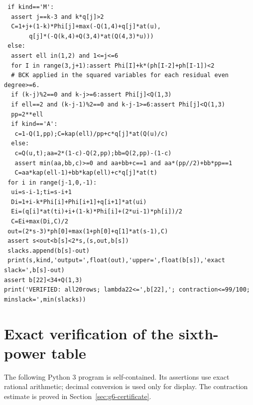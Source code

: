 \documentclass[11pt,reqno]{amsart}
\numberwithin{equation}{section}
\theoremstyle{definition}
\begin{document}
\begin{lstlisting}
 if kind=='M':
  assert j==k-3 and k*q[j]>2
  C=1+j+(1-k)*Phi[j]+max(-Q(1,4)+q[j]*at(u),
       q[j]*(-Q(k,4)+Q(3,4)*at(Q(4,3)*u)))
 else:
  assert ell in(1,2) and 1<=j<=6
  for I in range(3,j+1):assert Phi[I]+k*(ph[I-2]+ph[I-1])<2
  # BCK applied in the squared variables for each residual even degree>=6.
  if (k-j)%2==0 and k-j>=6:assert Phi[j]<Q(1,3)
  if ell==2 and (k-j-1)%2==0 and k-j-1>=6:assert Phi[j]<Q(1,3)
  pp=2**ell
  if kind=='A':
   c=1-Q(1,pp);C=kap(ell)/pp+c*q[j]*at(Q(u)/c)
  else:
   c=Q(u,t);aa=2*(1-c)-Q(2,pp);bb=Q(2,pp)-(1-c)
   assert min(aa,bb,c)>=0 and aa+bb+c==1 and aa*(pp//2)+bb*pp==1
   C=aa*kap(ell-1)+bb*kap(ell)+c*q[j]*at(t)
 for i in range(j-1,0,-1):
  ui=s-i-1;ti=s-i+1
  Di=1+i-k*Phi[i]+Phi[i+1]+q[i+1]*at(ui)
  Ei=(q[i]*at(ti)+i+(1-k)*Phi[i]+(2*ui-1)*ph[i])/2
  C=Ei+max(Di,C)/2
 out=(2*s-3)*ph[0]+max(1+ph[0]+q[1]*at(s-1),C)
 assert s<out<b[s]<2*s,(s,out,b[s])
 slacks.append(b[s]-out)
 print(s,kind,'output=',float(out),'upper=',float(b[s]),'exact slack=',b[s]-out)
assert b[22]<34+Q(1,3)
print('VERIFIED: all20rows; lambda22<=',b[22],'; contraction<=99/100; minslack=',min(slacks))
\end{lstlisting}
\section{Exact verification of the sixth-power table}
\label{app:sixth}
The following Python 3 program is self-contained. Its assertions use exact
rational arithmetic; decimal conversion is used only for display. The
contraction estimate is proved in Section~\ref{sec:g6-certificate}.
\end{document}
